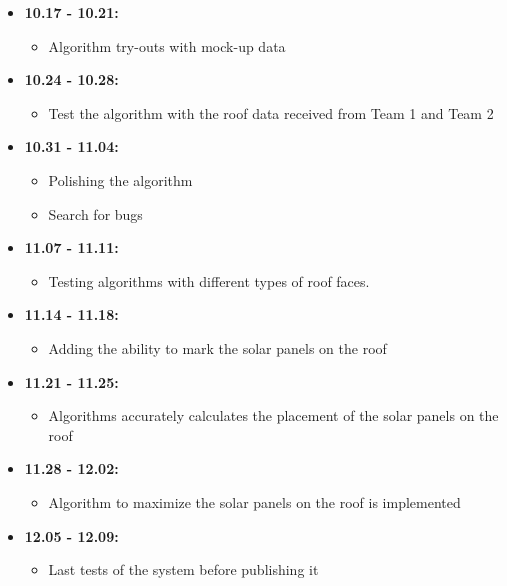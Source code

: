 \documentclass[a4paper,12pt,fleqn]{article}
\begin{document}
\begin{itemize}
    \item \textbf{10.17 - 10.21:}
    \begin{itemize}
        \item Algorithm try-outs with mock-up data
    \end{itemize}
    
    \item \textbf{10.24 - 10.28:}
    \begin{itemize}
        \item Test the algorithm with the roof data received from Team 1 and Team 2
    \end{itemize}
    
    \item \textbf{10.31 - 11.04:}
    \begin{itemize}
        \item Polishing the algorithm
        \item Search for bugs
    \end{itemize}
    
    \item \textbf{11.07 - 11.11:}
    \begin{itemize}
        \item Testing algorithms with different types of roof faces.
    \end{itemize}
    
    \item \textbf{11.14 - 11.18:}
    \begin{itemize}
        \item Adding the ability to mark the solar panels on the roof
    \end{itemize}
    
    \item \textbf{11.21 - 11.25:}
    \begin{itemize}
        \item Algorithms accurately calculates the placement of the solar panels on the roof
    \end{itemize}
    
    \item \textbf{11.28 - 12.02:}
    \begin{itemize}
        \item Algorithm to maximize the solar panels on the roof is implemented
    \end{itemize}
    
    \item \textbf{12.05 - 12.09:}
    \begin{itemize}
        \item Last tests of the system before publishing it
    \end{itemize}
\end{itemize}
\end{document}
